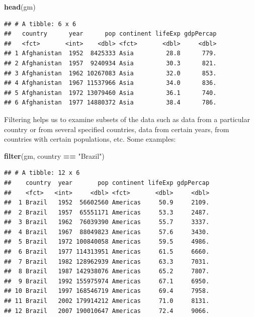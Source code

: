 \documentclass[]{article}
\newenvironment{Shaded}{\begin{snugshade}}{\end{snugshade}}
\newcommand{\KeywordTok}[1]{\textcolor[rgb]{0.13,0.29,0.53}{\textbf{#1}}}
\newcommand{\StringTok}[1]{\textcolor[rgb]{0.31,0.60,0.02}{#1}}
\newcommand{\OperatorTok}[1]{\textcolor[rgb]{0.81,0.36,0.00}{\textbf{#1}}}
\newcommand{\NormalTok}[1]{#1}
\begin{document}
\begin{Shaded}
\begin{Highlighting}[]
\KeywordTok{head}\NormalTok{(gm)}
\end{Highlighting}
\end{Shaded}

\begin{verbatim}
## # A tibble: 6 x 6
##   country      year      pop continent lifeExp gdpPercap
##   <fct>       <int>    <dbl> <fct>       <dbl>     <dbl>
## 1 Afghanistan  1952  8425333 Asia         28.8      779.
## 2 Afghanistan  1957  9240934 Asia         30.3      821.
## 3 Afghanistan  1962 10267083 Asia         32.0      853.
## 4 Afghanistan  1967 11537966 Asia         34.0      836.
## 5 Afghanistan  1972 13079460 Asia         36.1      740.
## 6 Afghanistan  1977 14880372 Asia         38.4      786.
\end{verbatim}

Filtering helps us to examine subsets of the data such as data from a
particular country or from several specified countries, data from
certain years, from countries with certain populations, etc. Some
examples:

\begin{Shaded}
\begin{Highlighting}[]
\KeywordTok{filter}\NormalTok{(gm, country }\OperatorTok{==}\StringTok{ "Brazil"}\NormalTok{)}
\end{Highlighting}
\end{Shaded}

\begin{verbatim}
## # A tibble: 12 x 6
##    country  year       pop continent lifeExp gdpPercap
##    <fct>   <int>     <dbl> <fct>       <dbl>     <dbl>
##  1 Brazil   1952  56602560 Americas     50.9     2109.
##  2 Brazil   1957  65551171 Americas     53.3     2487.
##  3 Brazil   1962  76039390 Americas     55.7     3337.
##  4 Brazil   1967  88049823 Americas     57.6     3430.
##  5 Brazil   1972 100840058 Americas     59.5     4986.
##  6 Brazil   1977 114313951 Americas     61.5     6660.
##  7 Brazil   1982 128962939 Americas     63.3     7031.
##  8 Brazil   1987 142938076 Americas     65.2     7807.
##  9 Brazil   1992 155975974 Americas     67.1     6950.
## 10 Brazil   1997 168546719 Americas     69.4     7958.
## 11 Brazil   2002 179914212 Americas     71.0     8131.
## 12 Brazil   2007 190010647 Americas     72.4     9066.
\end{verbatim}

\begin{Shaded}
\end{Shaded}
\end{document}
